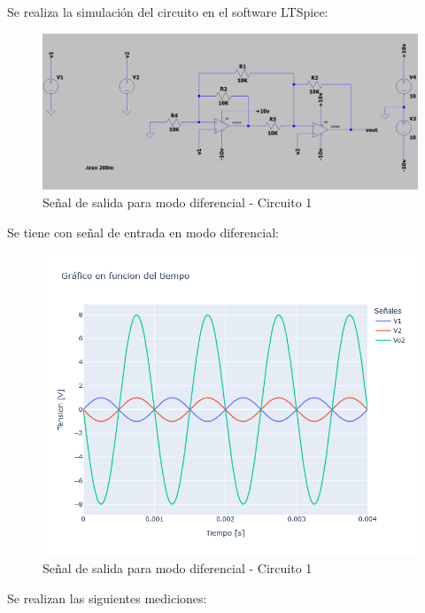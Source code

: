 Se realiza la simulación del circuito en el software LTSpice:

\begin{figure}[h]
    \centering
    \includegraphics[width=1\linewidth]{Secciones/Circuito1/circuito1_simulacion.png}
    \caption{Señal de salida para modo diferencial - Circuito 1}
    \label{fig:Circuito1Simulacion}
\end{figure}

\hspace{1mm} Se tiene con señal de entrada en modo diferencial:

\begin{figure}[h!]
    \centering
    \includegraphics[width=1\linewidth]{Secciones/Circuito1/TP1_1_Vo2_V1_V2_vs_t.png}
    
    \caption{Señal de salida para modo diferencial - Circuito 1}
    \label{fig:Circuito1Diferencial}
\end{figure}

Se realizan las siguientes mediciones:

